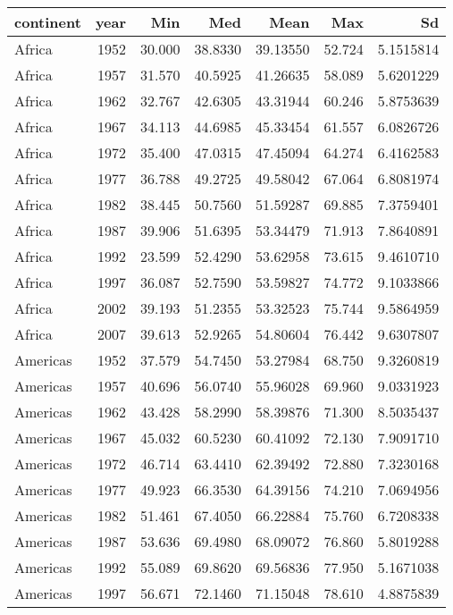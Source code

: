 \documentclass[
]{article}
\begin{document}
\begin{longtable}[]{@{}lrrrrrr@{}}
\toprule\noalign{}
continent & year & Min & Med & Mean & Max & Sd \\
\midrule\noalign{}
\endhead
\bottomrule\noalign{}
\endlastfoot
Africa & 1952 & 30.000 & 38.8330 & 39.13550 & 52.724 & 5.1515814 \\
Africa & 1957 & 31.570 & 40.5925 & 41.26635 & 58.089 & 5.6201229 \\
Africa & 1962 & 32.767 & 42.6305 & 43.31944 & 60.246 & 5.8753639 \\
Africa & 1967 & 34.113 & 44.6985 & 45.33454 & 61.557 & 6.0826726 \\
Africa & 1972 & 35.400 & 47.0315 & 47.45094 & 64.274 & 6.4162583 \\
Africa & 1977 & 36.788 & 49.2725 & 49.58042 & 67.064 & 6.8081974 \\
Africa & 1982 & 38.445 & 50.7560 & 51.59287 & 69.885 & 7.3759401 \\
Africa & 1987 & 39.906 & 51.6395 & 53.34479 & 71.913 & 7.8640891 \\
Africa & 1992 & 23.599 & 52.4290 & 53.62958 & 73.615 & 9.4610710 \\
Africa & 1997 & 36.087 & 52.7590 & 53.59827 & 74.772 & 9.1033866 \\
Africa & 2002 & 39.193 & 51.2355 & 53.32523 & 75.744 & 9.5864959 \\
Africa & 2007 & 39.613 & 52.9265 & 54.80604 & 76.442 & 9.6307807 \\
Americas & 1952 & 37.579 & 54.7450 & 53.27984 & 68.750 & 9.3260819 \\
Americas & 1957 & 40.696 & 56.0740 & 55.96028 & 69.960 & 9.0331923 \\
Americas & 1962 & 43.428 & 58.2990 & 58.39876 & 71.300 & 8.5035437 \\
Americas & 1967 & 45.032 & 60.5230 & 60.41092 & 72.130 & 7.9091710 \\
Americas & 1972 & 46.714 & 63.4410 & 62.39492 & 72.880 & 7.3230168 \\
Americas & 1977 & 49.923 & 66.3530 & 64.39156 & 74.210 & 7.0694956 \\
Americas & 1982 & 51.461 & 67.4050 & 66.22884 & 75.760 & 6.7208338 \\
Americas & 1987 & 53.636 & 69.4980 & 68.09072 & 76.860 & 5.8019288 \\
Americas & 1992 & 55.089 & 69.8620 & 69.56836 & 77.950 & 5.1671038 \\
Americas & 1997 & 56.671 & 72.1460 & 71.15048 & 78.610 & 4.8875839 \\

\end{longtable}
\end{document}
